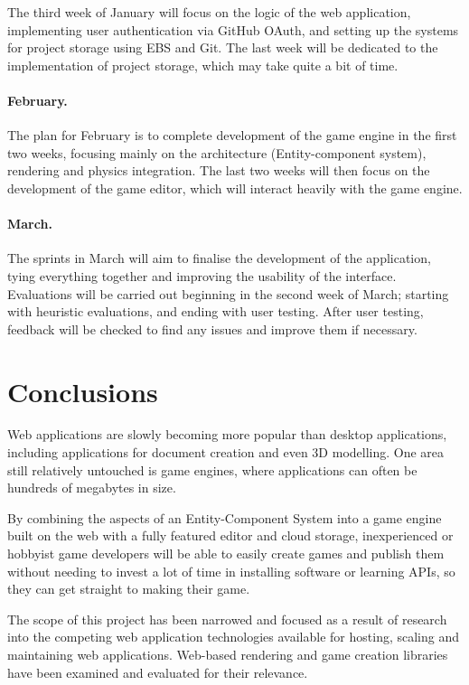 \documentclass[a4paper, 12pt]{article}
\begin{document}
The third week of January will focus on the logic of the web application, implementing user authentication via GitHub OAuth, and setting up the systems for project storage using EBS and Git. The last week will be dedicated to the implementation of project storage, which may take quite a bit of time.

\paragraph{February.}
The plan for February is to complete development of the game engine in the first two weeks, focusing mainly on the architecture (Entity-component system), rendering and physics integration. The last two weeks will then focus on the development of the game editor, which will interact heavily with the game engine.

\paragraph{March.}
The sprints in March will aim to finalise the development of the application, tying everything together and improving the usability of the interface. Evaluations will be carried out beginning in the second week of March; starting with heuristic evaluations, and ending with user testing. After user testing, feedback will be checked to find any issues and improve them if necessary.

\section{Conclusions}
Web applications are slowly becoming more popular than desktop applications, including applications for document creation and even 3D modelling. One area still relatively untouched is game engines, where applications can often be hundreds of megabytes in size.

By combining the aspects of an Entity-Component System into a game engine built on the web with a fully featured editor and cloud storage, inexperienced or hobbyist game developers will be able to easily create games and publish them without needing to invest a lot of time in installing software or learning APIs, so they can get straight to making their game.

The scope of this project has been narrowed and focused as a result of research into the competing web application technologies available for hosting, scaling and maintaining web applications. Web-based rendering and game creation libraries have been examined and evaluated for their relevance.
\end{document}
